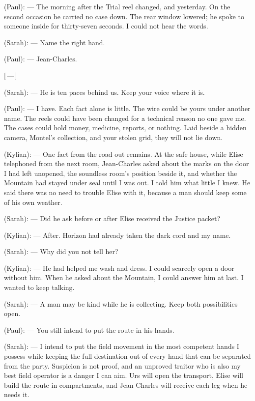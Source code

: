 \begin{room}
(Paul): --- The morning after the Trial reel changed, and yesterday. On the second occasion he carried no case down. The rear window lowered; he spoke to someone inside for thirty-seven seconds. I could not hear the words.

(Sarah): --- Name the right hand.

(Paul): --- Jean-Charles.

\centerline{[\,---\,]}

(Sarah): --- He is ten paces behind us. Keep your voice where it is.

(Paul): --- I have. Each fact alone is little. The wire could be yours under another name. The reels could have been changed for a technical reason no one gave me. The cases could hold money, medicine, reports, or nothing. Laid beside a hidden camera, Montel's collection, and your stolen grid, they will not lie down.

(Kylian): --- One fact from the road out remains. At the safe house, while Elise telephoned from the next room, Jean-Charles asked about the marks on the door I had left unopened, the soundless room's position beside it, and whether the Mountain had stayed under seal until I was out. I told him what little I knew. He said there was no need to trouble Elise with it, because a man should keep some of his own weather.

(Sarah): --- Did he ask before or after Elise received the Justice packet?

(Kylian): --- After. Horizon had already taken the dark cord and my name.

(Sarah): --- Why did you not tell her?

(Kylian): --- He had helped me wash and dress. I could scarcely open a door without him. When he asked about the Mountain, I could answer him at last. I wanted to keep talking.

(Sarah): --- A man may be kind while he is collecting. Keep both possibilities open.

(Paul): --- You still intend to put the route in his hands.

(Sarah): --- I intend to put the field movement in the most competent hands I possess while keeping the full destination out of every hand that can be separated from the party. Suspicion is not proof, and an unproved traitor who is also my best field operator is a danger I can aim. Urs will open the transport, Elise will build the route in compartments, and Jean-Charles will receive each leg when he needs it.


\end{room}
